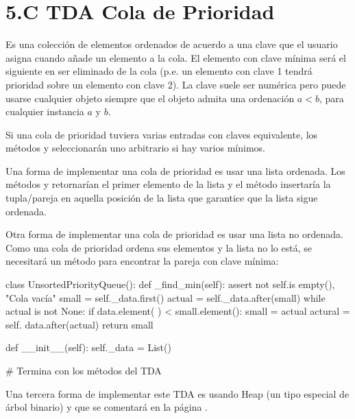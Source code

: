 \section*{5.C TDA Cola de Prioridad}
\label{sec:ColaPrioridad}

Es una colección de elementos ordenados de acuerdo a una clave que el usuario asigna cuando añade un elemento a la cola. 
El elemento con clave mínima será el siguiente en ser eliminado de la cola  (p.e. un elemento con clave 1 tendrá prioridad sobre un elemento con clave 2). 
La clave suele ser numérica pero puede usarse cualquier objeto siempre que el objeto admita una ordenación $a<b$, para cualquier instancia $a$ y $b$. 




Si una cola de prioridad tuviera varias entradas con claves equivalente, los métodos  y  seleccionarán uno arbitrario si hay varios mínimos.



Una forma de implementar una cola de prioridad es usar una lista ordenada. Los métodos   y   retornarían el primer elemento de la lista y el método  insertaría la tupla/pareja en aquella posición de la lista que garantice que la lista sigue ordenada.


Otra forma de implementar una cola de prioridad es usar una lista no ordenada. Como una cola de prioridad ordena sus elementos y la lista no lo está, se necesitará un método para encontrar la pareja con clave mínima:

\begin{pyverbatim}[][frame=single]
class UnsortedPriorityQueue():
  def _find_min(self):
    assert not self.is empty(), "Cola vacía"
    small = self._data.first()
    actual = self._data.after(small)
    while actual is not None:
      if data.element( ) < small.element():
        small = actual
      actural = self. data.after(actual)
    return small
    
  def __init__(self):
    self._data = List()
    
  # Termina con los métodos del TDA
\end{pyverbatim}

Una tercera forma de implementar este TDA es usando Heap (un tipo especial de árbol binario) y que se comentará en la página \pageref{sec:HeapSort}.



